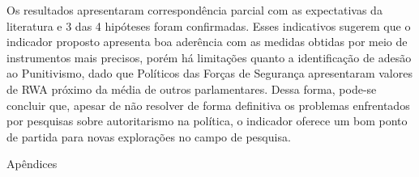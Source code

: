 \documentclass[
12pt,				%
openright,			%
twoside,			%
a4paper,			%
english,			%
french,				%
spanish,			%
brazil				%
]{abntex2}
\begin{document}
Os resultados apresentaram correspondência parcial com as expectativas da literatura e 3 das 4 hipóteses foram confirmadas. Esses indicativos sugerem que o indicador proposto apresenta boa aderência com as medidas obtidas por meio de instrumentos mais precisos, porém há limitações quanto a identificação de adesão ao Punitivismo, dado que Políticos das Forças de Segurança apresentaram valores de RWA próximo da média de outros parlamentares. Dessa forma, pode-se concluir que, apesar de não resolver de forma definitiva os problemas enfrentados por pesquisas sobre autoritarismo na política, o indicador oferece um bom ponto de partida para novas explorações no campo de pesquisa.


\postextual



%
%


Apêndices

\printindex
\end{document}
